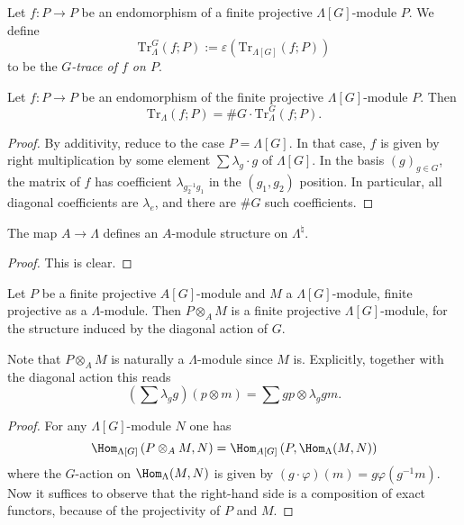 \begin{definition}
\label{definition-trace-G}
Let $f : P\to P$ be an
endomorphism of a finite projective $\Lambda[G]$-module
$P$. We define
$$
\text{Tr}_{\Lambda}^G(f; P) := \varepsilon\left(\text{Tr}_{\Lambda[G]}(f;
P)\right)
$$
to be the {\it $G$-trace of $f$ on $P$}.
\end{definition}

\begin{lemma}
\label{lemma-lambda-trace}
Let $f : P\to P$ be an endomorphism of the finite projective
$\Lambda[G]$-module $P$. Then
$$
\text{Tr}_{\Lambda}(f; P) = \# G \cdot \text{Tr}_\Lambda^G(f; P).
$$
\end{lemma}

\begin{proof}
By additivity, reduce to the case $P = \Lambda[G]$.
In that case, $f$ is given by
right multiplication by some element $\sum\lambda_g\cdot g$ of $\Lambda[G]$. In
the basis $(g)_{g \in G}$, the matrix of $f$ has coefficient
$\lambda_{g_2^{-1}g_1}$ in the $(g_1, g_2)$ position. In particular, all
diagonal coefficients are $\lambda_e$, and there are $\# G$ such coefficients.
\end{proof}

\begin{lemma}
\label{lemma-A-module-structure}
The map $A\to \Lambda$ defines an $A$-module structure on $\Lambda^\natural$.
\end{lemma}

\begin{proof}
This is clear.
\end{proof}

\begin{lemma}
\label{lemma-diagonal-action-projective-module}
Let $P$ be a finite projective $A[G]$-module and $M$ a $\Lambda[G]$-module,
finite projective as a $\Lambda$-module. Then $P \otimes_A M$ is a finite
projective $\Lambda[G]$-module, for the structure induced by the diagonal
action of $G$.
\end{lemma}

\noindent
Note that $P \otimes_A M$ is naturally a $\Lambda$-module since $M$ is.
Explicitly, together with the diagonal action this reads
$$
\left(\sum\lambda_g g\right)\left(p \otimes m\right)
=
\sum g p \otimes \lambda_g g m.
$$

\begin{proof}
For any $\Lambda[G]$-module $N$ one has
$$
\Hom_{\Lambda[G]}\left(P \otimes_A M, N\right)= \Hom_{A[G]}\left(P,
\Hom_{\Lambda}(M, N)\right)
$$
where the $G$-action on $\Hom_{\Lambda}(M, N)$ is given by $(g\cdot
\varphi)(m) = g \varphi (g^{-1} m) $. Now it suffices to observe that the
right-hand side is a composition of exact functors, because of the projectivity
of $P$ and $M$.
\end{proof}

